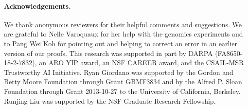\paragraph{Acknowledgements.} We thank anonymous reviewers for their helpful
comments and suggestions. We are grateful to Nelle Varoquaux for her help with
the genomics experiments and to Pang Wei Koh for pointing out and helping to
correct an error in an earlier version of our proofs. This research was
supported in part by DARPA (FA8650-18-2-7832), an ARO YIP award, an NSF CAREER
award, and the CSAIL-MSR Trustworthy AI Initiative. Ryan Giordano was supported
by the Gordon and Betty Moore Foundation through Grant GBMF3834 and by the
Alfred P. Sloan Foundation through Grant 2013-10-27 to the University of
California, Berkeley. Runjing Liu was supported by the NSF Graduate Research
Fellowship.
